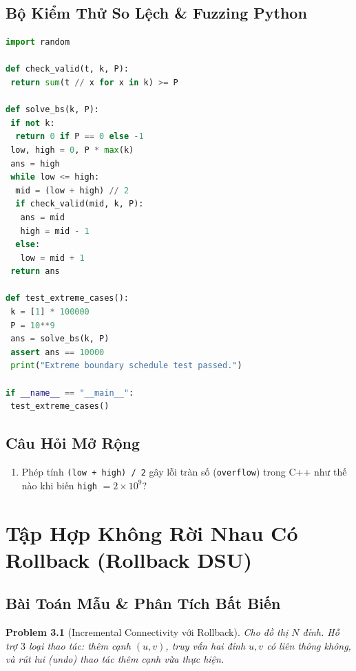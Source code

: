 \documentclass[11pt, letterpaper]{report}
\newtheorem{baitoan}{Problem}[chapter]
\begin{document}
\section{Bộ Kiểm Thử So Lệch \& Fuzzing Python}
\begin{lstlisting}[language=Python, caption={Python Fuzzer for Monotonic Predicate Invariant}]
import random

def check_valid(t, k, P):
 return sum(t // x for x in k) >= P

def solve_bs(k, P):
 if not k:
  return 0 if P == 0 else -1
 low, high = 0, P * max(k)
 ans = high
 while low <= high:
  mid = (low + high) // 2
  if check_valid(mid, k, P):
   ans = mid
   high = mid - 1
  else:
   low = mid + 1
 return ans

def test_extreme_cases():
 k = [1] * 100000
 P = 10**9
 ans = solve_bs(k, P)
 assert ans == 10000
 print("Extreme boundary schedule test passed.")

if __name__ == "__main__":
 test_extreme_cases()
\end{lstlisting}

\section{Câu Hỏi Mở Rộng}
\begin{enumerate}
 \item Phép tính \texttt{(low + high) / 2} gây lỗi tràn số (\texttt{overflow}) trong C++ như thế nào khi biến \texttt{high} $= 2 \times 10^9$?
\end{enumerate}

\chapter{Tập Hợp Không Rời Nhau Có Rollback (Rollback DSU)}
\label{mod:rollback_dsu}

\section{Bài Toán Mẫu \& Phân Tích Bất Biến}
\begin{baitoan}[Incremental Connectivity với Rollback]
Cho đồ thị $N$ đỉnh. Hỗ trợ $3$ loại thao tác: thêm cạnh $(u, v)$, truy vấn hai đỉnh $u, v$ có liên thông không, và rút lui (undo) thao tác thêm cạnh vừa thực hiện.
\end{baitoan}
\end{document}
